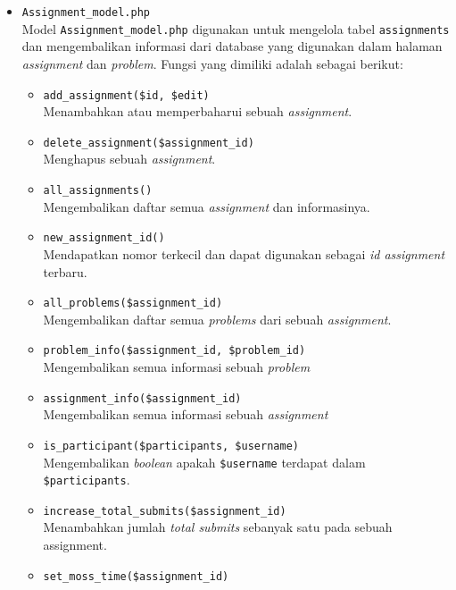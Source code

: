 \begin{itemize}
	\item \verb|Assignment_model.php| \\
	      Model \verb|Assignment_model.php| digunakan untuk mengelola tabel \verb|assignments| dan mengembalikan informasi dari database yang digunakan dalam halaman \textit{assignment} dan \textit{problem}. Fungsi yang dimiliki adalah sebagai berikut:

	      \begin{itemize}
		      \item \verb|add_assignment($id, $edit)| \\
		            Menambahkan atau memperbaharui sebuah \textit{assignment}.
		      \item \verb|delete_assignment($assignment_id)| \\
		            Menghapus sebuah \textit{assignment}.
		      \item \verb|all_assignments()| \\
		            Mengembalikan daftar semua \textit{assignment} dan informasinya.
		      \item \verb|new_assignment_id()| \\
		            Mendapatkan nomor terkecil dan dapat digunakan sebagai \textit{id assignment} terbaru.
		      \item \verb|all_problems($assignment_id)| \\
		            Mengembalikan daftar semua \textit{problems} dari sebuah \textit{assignment}.
		      \item \verb|problem_info($assignment_id, $problem_id)| \\
		            Mengembalikan semua informasi sebuah \textit{problem}
		      \item \verb|assignment_info($assignment_id)| \\
		            Mengembalikan semua informasi sebuah \textit{assignment}
		      \item \verb|is_participant($participants, $username)| \\
		            Mengembalikan \textit{boolean} apakah \verb|$username| terdapat dalam \verb|$participants|.
		      \item \verb|increase_total_submits($assignment_id)| \\
		            Menambahkan jumlah \textit{total submits} sebanyak satu pada sebuah assignment.
		      \item \verb|set_moss_time($assignment_id)| \\

\end{itemize}
\end{itemize}
